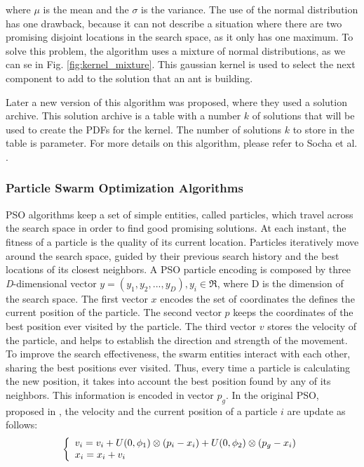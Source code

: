 					\noindent where $\mu$ is the mean and the $\sigma$ is the variance. The use of the normal distribution has one drawback, because it can not describe a situation where there are two promising disjoint locations in the search space, as it only has one maximum. To solve this problem, the algorithm uses a mixture of normal distributions, as we can se in Fig. \ref{fig:kernel_mixture}. This gaussian kernel is used to select the next component to add to the solution that an ant is building.

					 Later a new version of this algorithm was proposed, where they used a solution archive. This solution archive is a table with a number $k$ of solutions that will be used to create the PDFs for the kernel. The number of solutions $k$ to store in the table is parameter. For more details on this algorithm, please refer to Socha et al. \cite{socha08}.
					
					\subsubsection*{Particle Swarm Optimization Algorithms}
					PSO algorithms keep a set of simple entities, called particles, which travel across the search space in order to find good promising solutions. At each instant, the fitness of a particle is the quality of its current location. Particles iteratively move around the search space, guided by their previous search history and the best locations of its closest neighbors. A PSO particle encoding is composed by three \emph{D}-dimensional vector $y = (y_1,y_2,..., y_D), y_i \in \Re$, where D is the dimension of the search space. The first vector $x$ encodes the set of coordinates the defines the current position of the particle. The second vector $p$ keeps the coordinates of the best position ever visited by the particle. The third vector $v$ stores the velocity of the particle, and helps to establish the direction and strength of the movement.
					To improve the search effectiveness, the swarm entities interact with each other, sharing the best positions ever visited. Thus, every time a particle is calculating the new position, it takes into account the best position found by any of its neighbors. This information is encoded in vector $p_g$.
					In the original PSO, proposed in \cite{kennedy95}, the velocity and the current position of a particle $i$ are update as follows:
					\begin{equation}
						\label{eq:pso_update_rules}
						\left\{ 
						  \begin{array}{l l}
						    v_i = v_i + U(0, \phi_1) \otimes (p_i - x_i) +  U(0, \phi_2) \otimes (p_g - x_i)\\
						    x_i = x_i + v_i
						  \end{array} \right.
					\end{equation}
					
